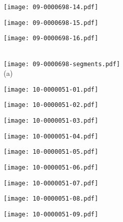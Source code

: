 \documentclass[10pt,twocolumn,letterpaper]{article}
\begin{document}
\begin{figure*}[t]
 \begin{minipage}{0.058\textwidth} \centering \texttt{[image: 09-0000698-14.pdf]} \end{minipage}
 \begin{minipage}{0.058\textwidth} \centering \texttt{[image: 09-0000698-15.pdf]} \end{minipage}
 \begin{minipage}{0.058\textwidth} \centering \texttt{[image: 09-0000698-16.pdf]} \end{minipage}
 \\ \vspace{2mm}
 \texttt{[image: 09-0000698-segments.pdf]}
 \\
 (a)
 \\ \vspace{2mm}
 \begin{minipage}{0.058\textwidth} \centering \texttt{[image: 10-0000051-01.pdf]} \end{minipage}
 \begin{minipage}{0.058\textwidth} \centering \texttt{[image: 10-0000051-02.pdf]} \end{minipage}
 \begin{minipage}{0.058\textwidth} \centering \texttt{[image: 10-0000051-03.pdf]} \end{minipage}
 \begin{minipage}{0.058\textwidth} \centering \texttt{[image: 10-0000051-04.pdf]} \end{minipage}
 \begin{minipage}{0.058\textwidth} \centering \texttt{[image: 10-0000051-05.pdf]} \end{minipage}
 \begin{minipage}{0.058\textwidth} \centering \texttt{[image: 10-0000051-06.pdf]} \end{minipage}
 \begin{minipage}{0.058\textwidth} \centering \texttt{[image: 10-0000051-07.pdf]} \end{minipage}
 \begin{minipage}{0.058\textwidth} \centering \texttt{[image: 10-0000051-08.pdf]} \end{minipage}
 \begin{minipage}{0.058\textwidth} \centering \texttt{[image: 10-0000051-09.pdf]} \end{minipage}

\end{figure*}
\end{document}
